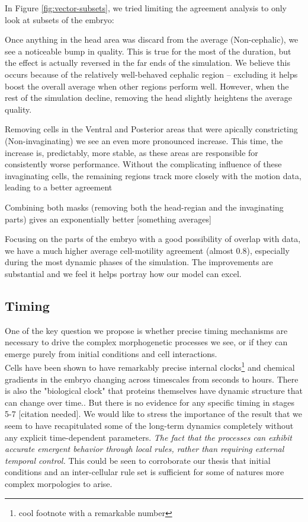 In Figure \ref{fig:vector-subsets}, we tried limiting the agreement analysis to only look at subsets of the embryo:

Once anything in the head area was discard from the average (Non-cephalic), we see a noticeable bump in quality. This is true for the most of the duration, but the effect is actually reversed in the far ends of the simulation. We believe this occurs because of the relatively well-behaved cephalic region --  excluding it helps boost the overall average when other regions perform well. However, when the rest of the simulation decline, removing the head slightly heightens the average quality. 

Removing cells in the Ventral and Posterior areas that were apically constricting (Non-invaginating) we see an even more pronounced increase. This time, the increase is, predictably, more stable, as these areas are responsible for consistently worse performance. Without the complicating influence of these invaginating cells, the remaining regions track more closely with the motion data, leading to a better  agreement

Combining both masks (removing both the head-regian and the  invaginating parts) gives an exponentially better [something averages]


Focusing on the parts of the embryo with a good possibility of overlap with data, we have a much higher average cell-motility agreement (almost 0.8), especially during the most dynamic phases of the simulation. The improvements are substantial and we feel it helps portray how our model can excel.





\subsection{Timing}
One of the key question we propose is whether precise timing mechanisms are necessary to drive the complex morphogenetic processes we see, or if they can emerge purely from initial conditions and cell interactions.\\
Cells have been shown to have remarkably precise internal clocks\footnote{cool footnote with a remarkable number\cite{cellinternal}} and chemical gradients in the embryo changing across timescales from seconds to hours\cite{shvartsman2008dynamics}. There is also the "biological clock"\cite{johanolsen2} that proteins themselves have dynamic structure that can change over time.\cite{johanolsen1}. But there is no evidence for any specific timing in stages 5-7 [citation needed]. We would like to stress the importance of the result that we seem to have recapitulated some of the long-term dynamics completely without any explicit time-dependent parameters. \textit{The fact  that the processes can exhibit accurate emergent behavior through local rules, rather than requiring external temporal control. }This could be seen to corroborate our thesis that initial conditions and an inter-cellular rule set is sufficient for some of natures more complex morpologies to arise. 

